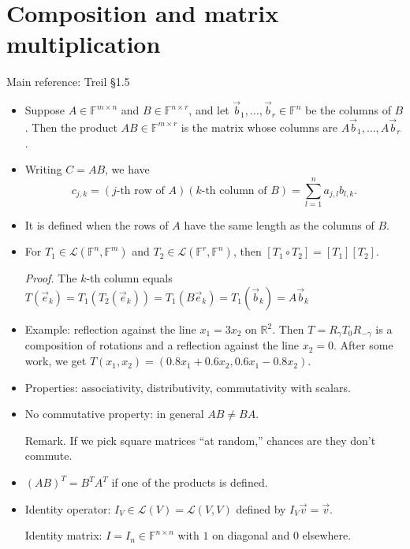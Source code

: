\documentclass[11pt]{article}
\newcommand{\1}{\mathbf{1}}
\newcommand{\0}{\mathbf{0}}
\newcommand{\F}{\mathbb{F}}
\newcommand{\cL}{\mathcal{L}}
\newcommand{\R}{\mathbb{R}}
\newcommand{\vb}{\vec{b}}
\newcommand{\ve}{\vec{e}}
\newcommand{\vv}{\vec{v}}
\begin{document}
\clearpage
\section{Composition and matrix multiplication}

Main reference:
Treil \S1.5

\begin{itemize}

\item

Suppose $A \in \F^{m \times n}$ and $B \in \F^{n \times r}$, and let $\vb_1, \dots, \vb_r \in \F^n$ be the columns of $B$.
Then the product $AB \in \F^{m \times r}$ is the matrix whose columns are $A\vb_1, \dots, A\vb_r$.

\item

Writing $C = AB$, we have \[ c_{j,k} = (j\text{-th row of }A)(k\text{-th column of }B) = \sum_{l=1}^{n}a_{j,l}b_{l,k}. \]

\item

It is defined when the rows of $A$ have the same length as the columns of $B$.

\item

For $T_1 \in \cL(\F^n,\F^m)$ and $T_2 \in \cL(\F^r,\F^n)$, then $[T_1 \circ T_2]=[T_1][T_2]$.

\emph{Proof.}
The $k$-th column equals
$T(\ve_k) = T_1(T_2(\ve_k))=T_1(B\ve_k)=T_1(\vb_k)=A\vb_k$

\item

Example: reflection against the line $x_1=3x_2$ on $\R^2$. Then $T=R_\gamma T_0 R_{-\gamma}$ is a composition of rotations and a reflection against the line $x_2=0$.
After some work, we get $T(x_1,x_2)=(0.8x_1+0.6x_2, 0.6x_1-0.8x_2)$.

\item

Properties: associativity, distributivity, commutativity with scalars.

\item

No commutative property: in general $AB\neq BA$.

Remark.
If we pick square matrices ``at random,'' chances are they don't commute.

\item

$(AB)^T = B^T\! A^T$ if one of the products is defined.

\item

Identity operator: $I_V \in \cL(V) = \cL(V,V)$ defined by $I_V \vv = \vv$.

Identity matrix: $I = I_n \in \F^{n \times n}$ with $1$ on diagonal and $0$ elsewhere.

\end{itemize}
\end{document}

